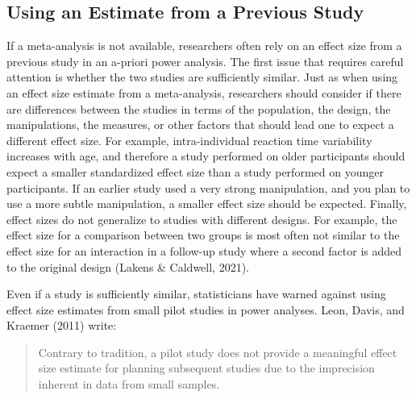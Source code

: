 \documentclass[
  english,
  ,jou,floatsintext]{apa6}
\begin{document}
\hypertarget{using-an-estimate-from-a-previous-study}{%
\subsection{Using an Estimate from a Previous Study}\label{using-an-estimate-from-a-previous-study}}

If a meta-analysis is not available, researchers often rely on an effect size from a previous study in an a-priori power analysis. The first issue that requires careful attention is whether the two studies are sufficiently similar. Just as when using an effect size estimate from a meta-analysis, researchers should consider if there are differences between the studies in terms of the population, the design, the manipulations, the measures, or other factors that should lead one to expect a different effect size. For example, intra-individual reaction time variability increases with age, and therefore a study performed on older participants should expect a smaller standardized effect size than a study performed on younger participants. If an earlier study used a very strong manipulation, and you plan to use a more subtle manipulation, a smaller effect size should be expected. Finally, effect sizes do not generalize to studies with different designs. For example, the effect size for a comparison between two groups is most often not similar to the effect size for an interaction in a follow-up study where a second factor is added to the original design (Lakens \& Caldwell, 2021).

Even if a study is sufficiently similar, statisticians have warned against using effect size estimates from small pilot studies in power analyses. Leon, Davis, and Kraemer (2011) write:

\begin{quote}
Contrary to tradition, a pilot study does not provide a meaningful effect size estimate for planning subsequent studies due to the imprecision inherent in data from small samples.
\end{quote}
\end{document}
